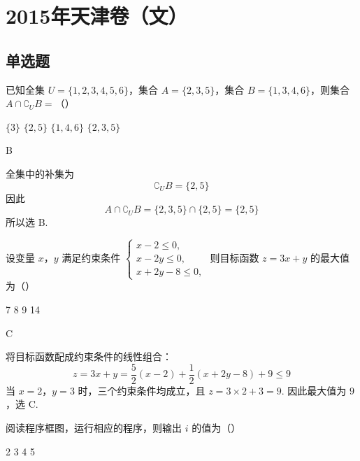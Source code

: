 \chapter{2015年天津卷（文）}

\section{单选题}

\begin{problem}
已知全集 \(U = \{1, 2, 3, 4, 5, 6\}\)，集合 \(A = \{2, 3, 5\}\)，集合 \(B = \{1, 3, 4, 6\}\)，则集合 \(A \cap \complement_U B =\)（\quad）

\choices
    {\( \{3\} \)}
    {\(\{2, 5\}\)}
    {\(\{1, 4, 6\}\)}
    {\(\{2, 3, 5\}\)}
\end{problem}

\begin{answer}
B
\end{answer}

\begin{solution}
全集中的补集为
\[
\complement_U B=\{2,5\}
\]
因此
\[
A\cap\complement_U B=\{2,3,5\}\cap\{2,5\}=\{2,5\}
\]
所以选 B.
\end{solution}

\begin{problem}
设变量 \(x\)，\(y\) 满足约束条件 \(\begin{cases}
x - 2 \leqslant 0,\\
x - 2y \leqslant 0,\\
x + 2y - 8 \leqslant 0,
\end{cases}\) 则目标函数 \(z = 3x + y\) 的最大值为（\quad）

\choices
    {7}
    {8}
    {9}
    {14}
\end{problem}

\begin{answer}
C
\end{answer}

\begin{solution}
将目标函数配成约束条件的线性组合：
\[
z=3x+y=\frac{5}{2}(x-2)+\frac{1}{2}(x+2y-8)+9\leqslant9
\]
当 \(x=2\)，\(y=3\) 时，三个约束条件均成立，且 \(z=3\times2+3=9\). 因此最大值为 \(9\)，选 C.
\end{solution}

\begin{problem}
阅读程序框图，运行相应的程序，则输出 \(i\) 的值为（\quad）


\choices
    {2}
    {3}
    {4}
    {5}
\end{problem}

